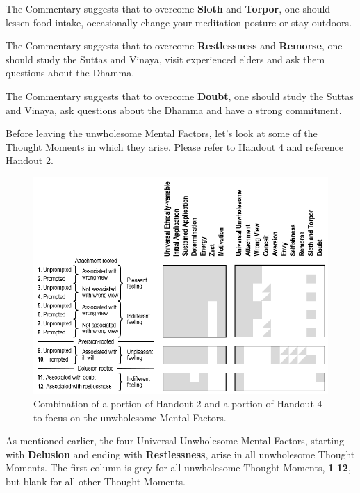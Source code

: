 The Commentary suggests that to overcome \textbf{Sloth} and \textbf{Torpor}, one should lessen food intake, occasionally change your meditation posture or stay outdoors.

The Commentary suggests that to overcome \textbf{Restlessness} and \textbf{Remorse}, one should study the Suttas and Vinaya, visit experienced elders and ask them questions about the Dhamma.

The Commentary suggests that to overcome \textbf{Doubt}, one should study the Suttas and Vinaya, ask questions about the Dhamma and have a strong commitment.

Before leaving the unwholesome Mental Factors, let’s look at some of the Thought Moments in which they arise. Please refer to Handout 4 and reference Handout 2.

\begin{figure}[h]
\centering
\includegraphics[width=1\linewidth]{./Diagrams/Unwholesome}
\caption{Combination of a portion of Handout 2 and a portion of Handout 4 to focus on the unwholesome Mental Factors.}
\label{fig:Unwholesome}
\end{figure}

As mentioned earlier, the four Universal Unwholesome Mental Factors, starting with \textbf{Delusion} and ending with \textbf{Restlessness}, arise in all unwholesome Thought Moments. The first column is grey for all unwholesome Thought Moments, \textbf{1}-\textbf{12}, but blank for all other Thought Moments.

